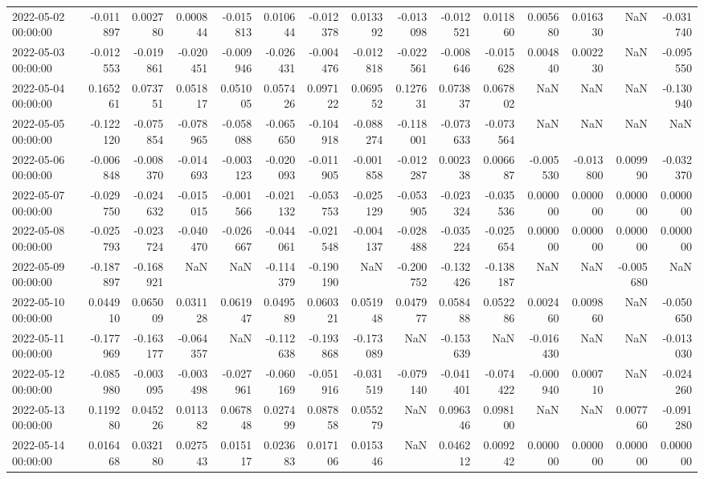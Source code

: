 \begin{tabular}{lrrrrrrrrrrrrrr}
2022-05-02 00:00:00 & -0.011897 & 0.002780 & 0.000844 & -0.015813 & 0.010644 & -0.012378 & 0.013392 & -0.013098 & -0.012521 & 0.011860 & 0.005680 & 0.016330 & NaN & -0.031740 \\
2022-05-03 00:00:00 & -0.012553 & -0.019861 & -0.020451 & -0.009946 & -0.026431 & -0.004476 & -0.012818 & -0.022561 & -0.008646 & -0.015628 & 0.004840 & 0.002230 & NaN & -0.095550 \\
2022-05-04 00:00:00 & 0.165261 & 0.073751 & 0.051817 & 0.051005 & 0.057426 & 0.097122 & 0.069552 & 0.127631 & 0.073837 & 0.067802 & NaN & NaN & NaN & -0.130940 \\
2022-05-05 00:00:00 & -0.122120 & -0.075854 & -0.078965 & -0.058088 & -0.065650 & -0.104918 & -0.088274 & -0.118001 & -0.073633 & -0.073564 & NaN & NaN & NaN & NaN \\
2022-05-06 00:00:00 & -0.006848 & -0.008370 & -0.014693 & -0.003123 & -0.020093 & -0.011905 & -0.001858 & -0.012287 & 0.002338 & 0.006687 & -0.005530 & -0.013800 & 0.009990 & -0.032370 \\
2022-05-07 00:00:00 & -0.029750 & -0.024632 & -0.015015 & -0.001566 & -0.021132 & -0.053753 & -0.025129 & -0.053905 & -0.023324 & -0.035536 & 0.000000 & 0.000000 & 0.000000 & 0.000000 \\
2022-05-08 00:00:00 & -0.025793 & -0.023724 & -0.040470 & -0.026667 & -0.044061 & -0.021548 & -0.004137 & -0.028488 & -0.035224 & -0.025654 & 0.000000 & 0.000000 & 0.000000 & 0.000000 \\
2022-05-09 00:00:00 & -0.187897 & -0.168921 & NaN & NaN & -0.114379 & -0.190190 & NaN & -0.200752 & -0.132426 & -0.138187 & NaN & NaN & -0.005680 & NaN \\
2022-05-10 00:00:00 & 0.044910 & 0.065009 & 0.031128 & 0.061947 & 0.049589 & 0.060321 & 0.051948 & 0.047977 & 0.058488 & 0.052286 & 0.002460 & 0.009860 & NaN & -0.050650 \\
2022-05-11 00:00:00 & -0.177969 & -0.163177 & -0.064357 & NaN & -0.112638 & -0.193868 & -0.173089 & NaN & -0.153639 & NaN & -0.016430 & NaN & NaN & -0.013030 \\
2022-05-12 00:00:00 & -0.085980 & -0.003095 & -0.003498 & -0.027961 & -0.060169 & -0.051916 & -0.031519 & -0.079140 & -0.041401 & -0.074422 & -0.000940 & 0.000710 & NaN & -0.024260 \\
2022-05-13 00:00:00 & 0.119280 & 0.045226 & 0.011382 & 0.067848 & 0.027499 & 0.087858 & 0.055279 & NaN & 0.096346 & 0.098100 & NaN & NaN & 0.007760 & -0.091280 \\
2022-05-14 00:00:00 & 0.016468 & 0.032180 & 0.027543 & 0.015117 & 0.023683 & 0.017106 & 0.015346 & NaN & 0.046212 & 0.009242 & 0.000000 & 0.000000 & 0.000000 & 0.000000 \\

\end{tabular}

